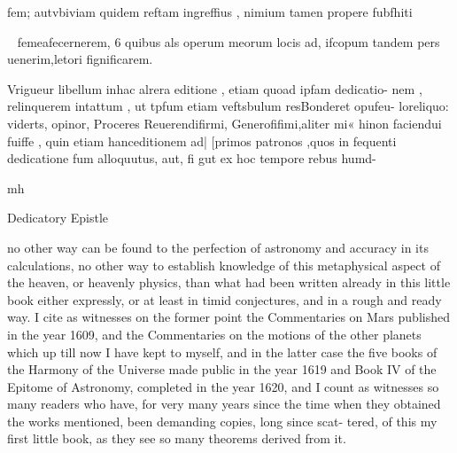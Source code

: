 \documentclass{article}
\begin{document}
fem; autvbiviam quidem reftam ingreffius , nimium tamen propere fubfhiti{~
femeafecernerem, 6 quibus als operum meorum locis ad, ifcopum tandem pers
uenerim,letori fignificarem.

Vrigueur libellum inhac alrera editione , etiam quoad ipfam dedicatio-
nem , relinquerem intattum , ut tpfum etiam veftsbulum resBonderet opufeu-
loreliquo: viderts, opinor, Proceres Reuerendifirmi, Generofifimi,aliter mi«
hinon faciendui fuiffe , quin etiam hanceditionem ad| [primos patronos ,quos
in fequenti dedicatione fum alloquutus, aut, fi gut ex hoc tempore rebus humd-

mh

Dedicatory Epistle

no other way can be found to the perfection of astronomy and accuracy
in its calculations, no other way to establish knowledge of this
metaphysical aspect of the heaven, or heavenly physics, than what had
been written already in this little book either expressly, or at least in timid
conjectures, and in a rough and ready way. I cite as witnesses on the
former point the Commentaries on Mars published in the year 1609, and
the Commentaries on the motions of the other planets which up till now I
have kept to myself, and in the latter case the five books of the Harmony
of the Universe made public in the year 1619 and Book IV of the Epitome
of Astronomy, completed in the year 1620, and I count as witnesses so
many readers who have, for very many years since the time when they
obtained the works mentioned, been demanding copies, long since scat-
tered, of this my first little book, as they see so many theorems derived
from it.

}
\end{document}
